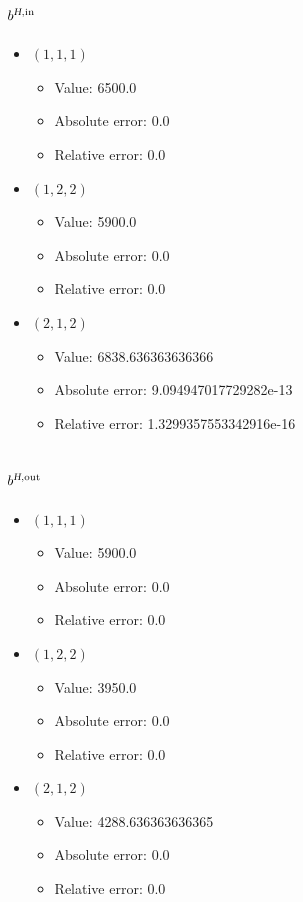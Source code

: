 \documentclass{article}%
\begin{document}
\subsection{$b^{\textsl{H},\text{in}}$}%
\begin{itemize}%
	\item $(1, 1, 1)$%
	\begin{itemize}%
		\item Value: 6500.0%
		\item Absolute error: 0.0%
		\item Relative error: 0.0%
	\end{itemize}%
	\item $(1, 2, 2)$%
	\begin{itemize}%
		\item Value: 5900.0%
		\item Absolute error: 0.0%
		\item Relative error: 0.0%
	\end{itemize}%
	\item $(2, 1, 2)$%
	\begin{itemize}%
		\item Value: 6838.636363636366%
		\item Absolute error: 9.094947017729282e-13%
		\item Relative error: 1.3299357553342916e-16%
	\end{itemize}%
\end{itemize}%
\subsection{$b^{\textsl{H},\text{out}}$}%
\begin{itemize}%
	\item $(1, 1, 1)$%
	\begin{itemize}%
		\item Value: 5900.0%
		\item Absolute error: 0.0%
		\item Relative error: 0.0%
	\end{itemize}%
	\item $(1, 2, 2)$%
	\begin{itemize}%
		\item Value: 3950.0%
		\item Absolute error: 0.0%
		\item Relative error: 0.0%
	\end{itemize}%
	\item $(2, 1, 2)$%
	\begin{itemize}%
		\item Value: 4288.636363636365%
		\item Absolute error: 0.0%
		\item Relative error: 0.0%
	\end{itemize}%
\end{itemize}%
\end{document}
